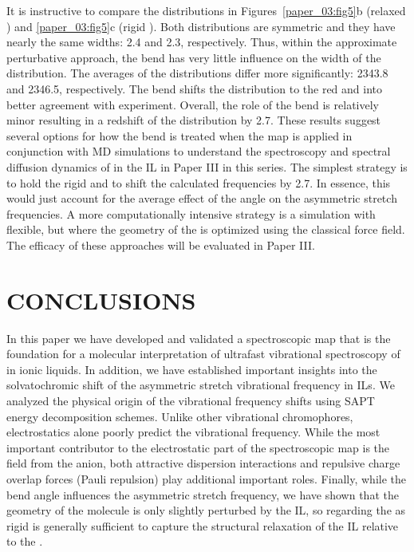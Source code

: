\documentclass[%
  class = book,%
  crop = false,%
  float = true,%
  multi = true,%
  preview = false,%
]{standalone}
\newcommand{\caps}[1]{\uppercase{#1}}
\begin{document}
It is instructive to compare the distributions in Figures~\ref{paper_03:fig5}b (relaxed ) and \ref{paper_03:fig5}c (rigid ). Both distributions are symmetric and they have nearly the same widths: \SI{2.4}{\wavenumber} and \SI{2.3}{\wavenumber}, respectively. Thus, within the approximate perturbative approach, the bend has very little influence on the width of the distribution. The averages of the distributions differ more significantly: \SI{2343.8}{\wavenumber} and \SI{2346.5}{\wavenumber}, respectively. The bend shifts the distribution to the red and into better agreement with experiment. Overall, the role of the bend is relatively minor resulting in a redshift of the distribution by \SI{2.7}{\wavenumber}. These results suggest several options for how the bend is treated when the map is applied in conjunction with MD simulations to understand the spectroscopy and spectral diffusion dynamics of  in the \ce{[C4C1im][PF6]} IL in Paper III\cite{Brinzer2018} in this series. The simplest strategy is to hold the  rigid and to shift the calculated frequencies by \SI{2.7}{\wavenumber}. In essence, this would just account for the average effect of the  angle on the asymmetric stretch frequencies. A more computationally intensive strategy is a simulation with  flexible, but where the geometry of the  is optimized using the classical force field. The efficacy of these approaches will be evaluated in Paper III\cite{Brinzer2018}.

\section{\texorpdfstring{\caps{Conclusions}}{Conclusions}}
\label{paper_03:sec:VI}

In this paper we have developed and validated a spectroscopic map that is the foundation for a molecular interpretation of ultrafast vibrational spectroscopy of  in ionic liquids. In addition, we have established important insights into the solvatochromic shift of the  asymmetric stretch vibrational frequency in ILs. We analyzed the physical origin of the vibrational frequency shifts using SAPT energy decomposition schemes. Unlike other vibrational chromophores, electrostatics alone poorly predict the vibrational frequency. While the most important contributor to the electrostatic part of the spectroscopic map is the field from the anion, both attractive dispersion interactions and repulsive charge overlap forces (Pauli repulsion) play additional important roles. Finally, while the  bend angle influences the asymmetric stretch frequency, we have shown that the geometry of the  molecule is only slightly perturbed by the IL, so regarding the  as rigid is generally sufficient to capture the structural relaxation of the IL relative to the .
\end{document}
